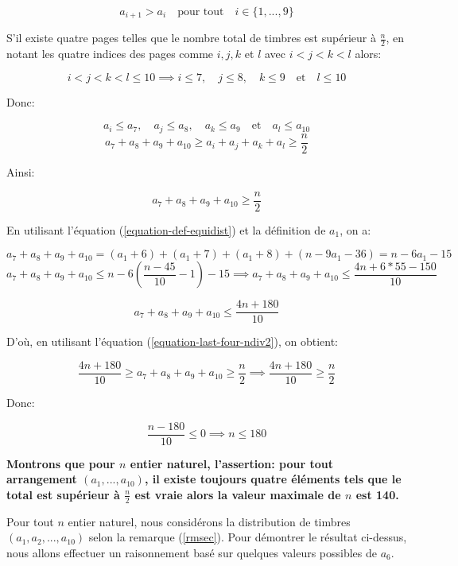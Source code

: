 \documentclass[12pt,a4paper,article]{memoir}
\begin{document}
\[a_{i+1} > a_{i} \quad \textrm{pour tout} \quad i \in \{1, ..., 9\} \]

S'il existe quatre pages telles que le nombre total de timbres est supérieur à $\frac{n}{2}$, en notant les quatre indices des pages comme $i, j, k$ et $l$ avec $i < j < k < l$ alors:

\[i < j < k < l \leq 10 \implies i \leq 7,\quad j \leq 8,\quad k \leq 9 \quad \textrm{et} \quad l \leq 10\]

Donc:

\[a_{i} \leq a_{7},\quad a_{j} \leq a_{8},\quad a_{k} \leq a_{9} \quad \textrm{et} \quad a_{l} \leq a_{10}\]
\[a_{7} + a_{8} + a_{9} + a_{10} \geq a_{i} + a_{j} + a_{k} + a_{l} \geq \frac{n}{2} \]

Ainsi:

\begin{equation}
a_{7} + a_{8} + a_{9} + a_{10} \geq \frac{n}{2}
\label{equation-last-four-ndiv2}
\end{equation}

En utilisant l'équation (\ref{equation-def-equidist}) et la définition de $a_{1}$, on a: 

\[a_{7} + a_{8} + a_{9} + a_{10} = (a_{1} + 6) + (a_{1} + 7) + (a_{1} + 8) + (n - 9a_{1} - 36) = n - 6a_{1} - 15\]
\[a_{7} + a_{8} + a_{9} + a_{10} \leq n - 6(\frac{n-45}{10} - 1) - 15 \implies a_{7} + a_{8} + a_{9} + a_{10} \leq \frac{4n+6*55-150}{10}\]

\[a_{7} + a_{8} + a_{9} + a_{10} \leq \frac{4n+180}{10}\]

D'où, en utilisant l'équation (\ref{equation-last-four-ndiv2}), on obtient:

\[\frac{4n+180}{10} \geq a_{7} + a_{8} + a_{9} + a_{10} \geq \frac{n}{2} \implies \frac{4n+180}{10} \geq \frac{n}{2}\]

Donc:

\[\frac{n - 180}{10} \leq 0 \implies n \leq 180\]

\bigskip

\textbf{Montrons que pour $n$ entier naturel, l'assertion: pour tout arrangement $(a_{1}, ..., a_{10})$, il existe toujours quatre éléments tels que le total est supérieur à $\frac{n}{2}$ est vraie alors la valeur maximale de $n$ est 140.}

\bigskip

Pour tout $n$ entier naturel, nous considérons la distribution de timbres $(a_{1}, a_{2}, ..., a_{10})$ selon la remarque (\ref{rmsec}). Pour démontrer le résultat ci-dessus, nous allons effectuer un raisonnement basé sur quelques valeurs possibles de $a_{6}$.
\end{document}
